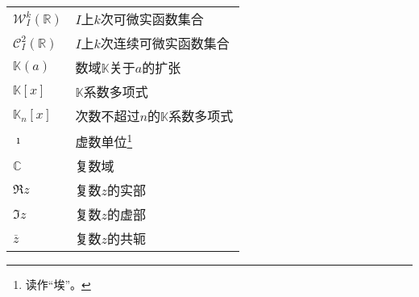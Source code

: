 \documentclass[12pt,UTF8]{article}
\begin{document}
\begin{longtable}{ m{15em} m{15em} }
    $\mathcal{W}^k_I(\mathbb{R})$ & $I$上$k$次可微实函数集合 \\
    $\mathcal{C}^2_I(\mathbb{R})$ & $I$上$k$次连续可微实函数集合 \\
    $\mathbb{K}(a)$ & 数域$\mathbb{K}$关于$a$的扩张 \\
    $\mathbb{K}[x]$ & $\mathbb{K}$系数多项式 \\
    $\mathbb{K}_n[x]$ & 次数不超过$n$的$\mathbb{K}$系数多项式 \\
    $\imath$ & 虚数单位\footnote{读作“埃”。} \\
    $\mathbb{C}$ & 复数域 \\
    $\Re{z}$ & 复数$z$的实部 \\
    $\Im{z}$ & 复数$z$的虚部 \\
    $\overline{z}$ & 复数$z$的共轭 \\


\end{longtable}
\end{document}
